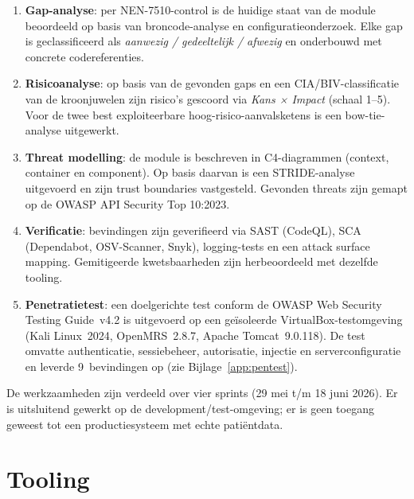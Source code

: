 \documentclass[12pt, a4paper]{report}
\begin{document}
\begin{enumerate}
    \item \textbf{Gap-analyse}: per NEN-7510-control is de huidige staat van de
          module beoordeeld op basis van broncode-analyse en configuratieonderzoek.
          Elke gap is geclassificeerd als \emph{aanwezig / gedeeltelijk / afwezig}
          en onderbouwd met concrete codereferenties.
    \item \textbf{Risicoanalyse}: op basis van de gevonden gaps en een CIA/BIV-classificatie
          van de kroonjuwelen zijn risico's gescoord via \emph{Kans × Impact} (schaal 1--5).
          Voor de twee best exploiteerbare hoog-risico-aanvalsketens is een
          bow-tie-analyse uitgewerkt.
    \item \textbf{Threat modelling}: de module is beschreven in C4-diagrammen (context,
          container en component). Op basis daarvan is een STRIDE-analyse uitgevoerd en
          zijn trust boundaries vastgesteld. Gevonden threats zijn gemapt op de
          OWASP API Security Top 10:2023.
    \item \textbf{Verificatie}: bevindingen zijn geverifieerd via SAST (CodeQL),
          SCA (Dependabot, OSV-Scanner, Snyk), logging-tests en een attack surface mapping.
          Gemitigeerde kwetsbaarheden zijn herbeoordeeld met dezelfde tooling.
    \item \textbf{Penetratietest}: een doelgerichte test conform de OWASP Web Security
          Testing Guide~v4.2 is uitgevoerd op een geïsoleerde VirtualBox-testomgeving
          (Kali Linux~2024, OpenMRS~2.8.7, Apache Tomcat~9.0.118). De test omvatte
          authenticatie, sessiebeheer, autorisatie, injectie en serverconfiguratie en
          leverde 9~bevindingen op (zie Bijlage~\ref{app:pentest}).
\end{enumerate}

De werkzaamheden zijn verdeeld over vier sprints (29 mei t/m 18 juni 2026).
Er is uitsluitend gewerkt op de development/test-omgeving; er is geen toegang
geweest tot een productiesysteem met echte patiëntdata.

\section{Tooling}
\label{sec:tooling}
\end{document}
